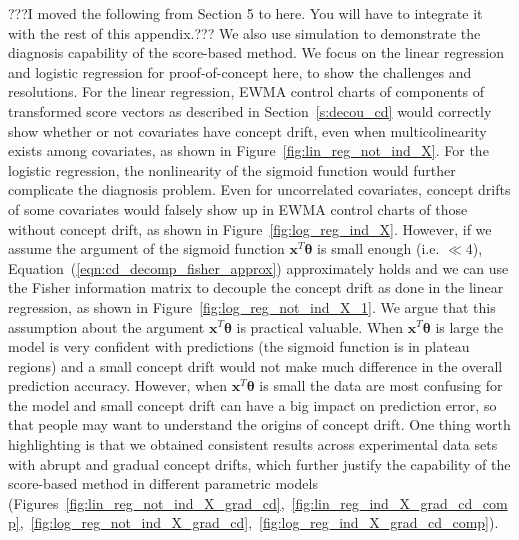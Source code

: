 \documentclass[twoside,11pt]{article}
\begin{document}
\begin{appendix}
???I moved the following from Section 5 to here. You will have to integrate it with the rest of this appendix.??? We also use simulation to demonstrate the diagnosis capability of the score-based method. We focus on the linear regression and logistic regression for proof-of-concept here, to show the challenges and resolutions. For the linear regression, EWMA control charts of components of transformed score vectors as described in Section~\ref{s:decou_cd} would correctly show whether or not covariates have concept drift, even when multicolinearity exists among covariates, as shown in Figure~\ref{fig:lin_reg_not_ind_X}. For the logistic regression, the nonlinearity of the sigmoid function would further complicate the diagnosis problem. Even for uncorrelated covariates, concept drifts of some covariates would falsely show up in EWMA control charts of those without concept drift, as shown in Figure~\ref{fig:log_reg_ind_X}. However, if we assume the argument of the sigmoid function $\bm{x}^T\bm{\theta}$ is small enough (i.e. $\ll 4$), Equation~(\ref{eqn:cd_decomp_fisher_approx}) approximately holds and we can use the Fisher information matrix to decouple the concept drift as done in the linear regression, as shown in Figure~\ref{fig:log_reg_not_ind_X_1}. We argue that this assumption about the argument $\bm{x}^T\bm{\theta}$ is practical valuable. When $\bm{x}^T\bm{\theta}$ is large the model is very confident with predictions (the sigmoid function is in plateau regions) and a small concept drift would not make much difference in the overall prediction accuracy. However, when $\bm{x}^T\bm{\theta}$ is small the data are most confusing for the model and small concept drift can have a big impact on prediction error, so that people may want to understand the origins of concept drift. One thing worth highlighting is that we obtained consistent results across experimental data sets with abrupt and gradual concept drifts, which further justify the capability of the score-based method in different parametric models (Figures~\ref{fig:lin_reg_not_ind_X_grad_cd},~\ref{fig:lin_reg_ind_X_grad_cd_comp},~\ref{fig:log_reg_not_ind_X_grad_cd},~\ref{fig:log_reg_ind_X_grad_cd_comp}).


\end{appendix}

\end{document}

